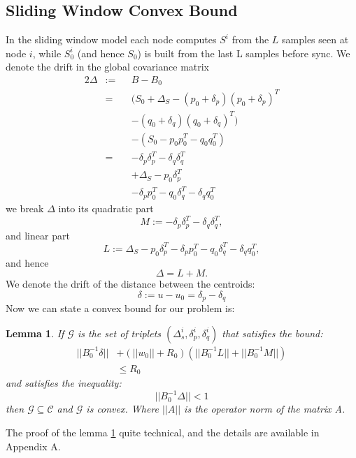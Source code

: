 \documentclass[11pt,twocolumn,varwidth=true,a4paper,fleqn]{article}
\newtheorem{lemma}{Lemma}
\begin{document}
\subsection{Sliding Window Convex Bound}
In the sliding window model each node computes $S^i$ from the $L$ samples seen
at node $i$, while $S_0^i$ (and hence $S_0$) is built from the last L samples before
sync. 
We denote the drift in the global covariance matrix
\begin{alignat*}{2}
\Delta & := && B-B_0 \\
& = && (S_0+\Delta_S - (p_0+\delta_p)(p_0+\delta_p)^T \\
& && - (q_0+\delta_q)(q_0+\delta_q)^T) \\
& && - (S_0 - p_0p_0^T - q_0q_0^T) \\
& = && - \delta_p\delta_p^T - \delta_q\delta_q^T \\
& && + \Delta_S - p_0\delta_p^T \\
& && - \delta_pp_0^T - q_0\delta_q^T - \delta_qq_0^T
\end{alignat*}
we break $\Delta$ into its quadratic part
\begin{equation*}
M:= - \delta_p\delta_p^T - \delta_q\delta_q^T, 
\end{equation*}
and linear part
\begin{equation*}
L:= \Delta_S - p_0\delta_p^T - \delta_pp_0^T - q_0\delta_q^T - \delta_qq_0^T, 
\end{equation*}
and hence 
\begin{equation*}
\Delta= L+ M.
\end{equation*}
We denote the drift of the distance between the centroids:
\begin{equation*}
\delta:= u-u_0 = \delta_p - \delta_q
\end{equation*}
Now we can state a convex bound for our problem is:
\begin{lemma} \label{convexBound}
If $\mathcal{G}$ is the set of triplets $(\Delta_s^i, \delta_p^i, \delta_q^i)$
 that satisfies the bound:
 \begin{equation*} 
\begin{split}
||B_0^{-1}\delta|| &+ (||w_0||+R_0)(||B_0^{-1}L||+||B_0^{-1}M||) \\ & \leq  R_0
\end{split}
\end{equation*}
and satisfies the inequality:
 \begin{equation*} 
||B_0^{-1}\Delta|| < 1
\end{equation*}
 then $\mathcal{G}
 \subseteq \mathcal{C}$ and $\mathcal{G}$ is convex.
Where $||A||$ is the operator norm of the matrix A.
\end{lemma}
The proof of the lemma \ref{convexBound} quite technical, and
the details are available in Appendix A.
\end{document}
